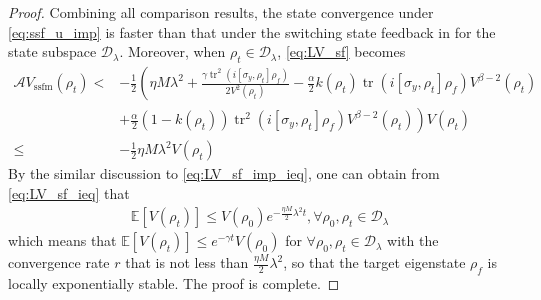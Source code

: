 \documentclass[]{elsarticle}
\begin{document}
\begin{proof}
	Combining all comparison results, the state convergence under \eqref{eq:ssf_u_imp} is faster than that under the switching state feedback in \cite{WSJZJ2021b} for the state subspace $\mathcal{D}_\lambda$.
	Moreover, when $\rho_{t}\in \mathcal{D}_\lambda$, \eqref{eq:LV_sf} becomes
	\begin{equation}\label{eq:LV_sf_ieq}
		\begin{aligned}
			\mathcal{A} V_{\mathrm{ssfm}}\left(\rho_{t}\right)<&-\frac{1}{2}\left({\eta M}\lambda^{2}+\frac{\gamma\operatorname{tr}^2\left(i\left[\sigma_{y}, \rho_{t}\right] {\rho_f}\right)}{2V^2\left(\rho_{t}\right)}
			-\frac{\alpha}{2}k\left(\rho_{t}\right)\operatorname{tr}\left(i\left[\sigma_{y}, \rho_{t}\right] {\rho_f}\right) V^{\beta-2}\left(\rho_{t}\right)\right.\\
			&\left.+\frac{\alpha}{2}\left(1-k\left(\rho_{t}\right)\right)\operatorname{tr}^2\left(i\left[\sigma_{y}, \rho_{t}\right] {\rho_f}\right)	V^{\beta-2}\left(\rho_{t}\right)\right)V\left(\rho_{t}\right)\\
			\le&-\frac{1}{2}{\eta M}\lambda^{2}V\left(\rho_{t}\right)
		\end{aligned}
	\end{equation}
	By the similar discussion to \eqref{eq:LV_sf_imp_ieq}, one can obtain from \eqref{eq:LV_sf_ieq} that
	\begin{equation}\label{eq:LV_sf_final2}
		\begin{aligned}
			\mathbb{E}\left[V(\rho_t)\right]\leq V({\rho}_0) e^{-\frac{\eta M}{2}\lambda^{2}t}, \forall \rho_{0}, \rho_{t}\in \mathcal{D}_\lambda
		\end{aligned}
	\end{equation}
	which means that $\mathbb{E}\left[V\left(\rho_{t}\right)\right]\le e^{-\gamma t} V\left(\rho_{0}\right)$ for $\forall \rho_{0}, \rho_{t}\in \mathcal{D}_\lambda$ with the convergence rate $r$ that is not less than $\frac{\eta M}{2}\lambda^{2}$, so that the target eigenstate $\rho_f$ is locally exponentially stable. The proof is complete.
\end{proof}
\end{document}
